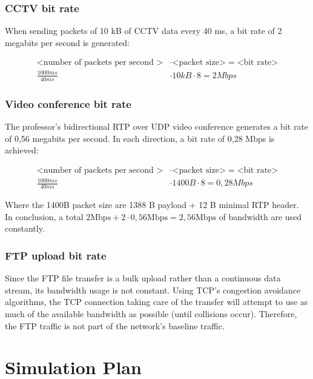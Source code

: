 \documentclass[
10pt, %
a4paper, %
oneside, %
headinclude,footinclude, %
BCOR5mm, %
]{scrartcl}
\begin{document}
\subsubsection{CCTV bit rate}
When sending packets of 10 kB of CCTV data every 40 ms, a bit rate of 2 megabits per second is generated:

\begin{align*}
\text{<number of packets per second >} &\cdot \text{<packet size>} = \text{<bit rate>}\\
\frac{1000ms}{40ms} &\cdot 10kB \cdot 8 = 2Mbps
\end{align*}

\subsubsection{Video conference bit rate}
The professor's bidirectional RTP over UDP video conference generates a bit rate of 0,56 megabits per second. In each direction, a bit rate of 0,28 Mbps is achieved:

\begin{align*}
\text{<number of packets per second >} &\cdot \text{<packet size>} = \text{<bit rate>}\\
\frac{1000ms}{40ms} &\cdot 1400B \cdot 8 = 0,28 Mbps
\end{align*}

Where the 1400B packet size are 1388 B payload + 12 B minimal RTP header.\\

In conclusion, a total $2\text{Mbps} + 2 \cdot 0,56 \text{Mbps} = 2,56 \text{Mbps}$ of bandwidth are used constantly.

\subsubsection{FTP upload bit rate}
Since the FTP file transfer is a bulk upload rather than a continuous data stream, its bandwidth usage is not constant. Using TCP's congestion avoidance algorithms, the TCP connection taking care of the transfer will attempt to use as much of the available bandwidth as possible (until collisions occur). Therefore, the FTP traffic is not part of the network's baseline traffic.


\section{Simulation Plan}
\label{sec:sim_plan}
\end{document}

